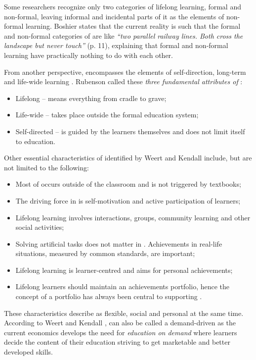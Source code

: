 Some researchers \citep{Longworth2003} recognize only two categories of lifelong
learning, formal and non-formal, leaving informal and incidental parts of it as
the elements of non-formal learning. Boshier \citeyearpar{Boshier2000} states
that the current reality is such that the formal and non-formal categories of
\LLLs are like \textit{``two parallel railway lines. Both cross the landscape but
never touch''} (p. 11), explaining that formal and non-formal learning have
practically nothing to do with each other.

From another perspective, \LLLs encompasses the elements of self-direction,
long-term and life-wide learning \citep{Schuetze2006}. Rubenson
\citeyearpar{Rubenson2002} called these \textit{three fundamental attributes of
\LLLs}:

\begin{itemize}
  \item Lifelong -- means everything from cradle to grave;
  \item Life-wide -- takes place outside the formal education system;
  \item Self-directed -- is guided by the learners themselves and does not
  limit itself to education.
\end{itemize} 

Other essential characteristics of \LLLs identified by Weert and Kendall
\citeyearpar{Kendall2004} include, but are not limited to the following:

\begin{itemize}
  \item Most of \LLLs occurs outside of the classroom and is not triggered by
  textbooks;
  \item The driving force in \LLLs is self-motivation and active participation
  of learners;
  \item Lifelong learning involves interactions, groups, community learning and
  other social activities;
  \item Solving artificial tasks does not matter in \LLLsn. Achievements in
  real-life situations, measured by common standards, are important;
  \item Lifelong learning is learner-centred and aims for personal
  achievements;
  \item Lifelong learners should maintain an achievements portfolio, hence the
  concept of a portfolio has always been central to supporting \LLLsn.
\end{itemize} 

These characteristics describe \LLLs as flexible, social and personal at the
same time. According to Weert and Kendall \citeyearpar{Kendall2004}, \LLLs can
also be called a demand-driven as the current economics develops the need for
\textit{education on demand} where learners decide the content of their
education striving to get marketable and better developed skills.


